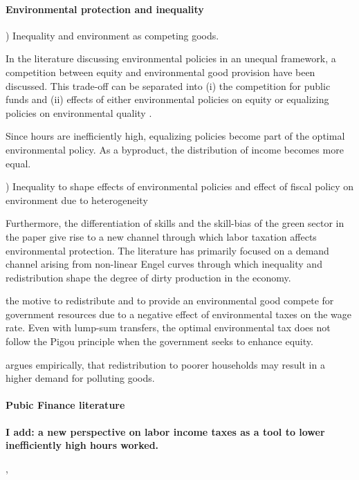 \paragraph{Environmental protection and inequality}
) Inequality and environment as competing goods.

In the literature discussing environmental policies in an unequal framework, a competition between equity and environmental good provision have been discussed. 
This trade-off can be separated into (i) the competition for public funds \citep{LansBovenberg1996OptimalAnalyses, Jacobs2019RedistributionCurves} and (ii) effects of either environmental policies on equity or equalizing policies on environmental quality \citep{Jacobs2019RedistributionCurves, Sager2019IncomeCurves, Dobkowitz2022}. 

Since hours are inefficiently high, equalizing policies become part of the optimal environmental policy. As a byproduct, the distribution of income becomes more equal.


) Inequality to shape effects of environmental policies and effect of fiscal policy on environment due to heterogeneity

 Furthermore, the differentiation of skills and the skill-bias of the green sector in the paper give rise to a new channel through which labor taxation affects environmental protection. The literature has primarily focused on a demand channel arising from non-linear Engel curves through which inequality and redistribution shape the degree of dirty production in the economy.   

\cite{Jacobs2019RedistributionCurves} the motive to redistribute and to provide an environmental good compete for government resources due to a negative effect of environmental taxes on the wage rate. Even with lump-sum transfers, the optimal environmental tax does not follow the Pigou principle when the government seeks to enhance equity.

\cite{Sager2019IncomeCurves} argues empirically, that redistribution to poorer households may result in a higher demand for polluting goods. 
\paragraph{Pubic Finance literature}
\textbf{I add: a new perspective on labor income taxes as a tool to lower inefficiently high hours worked. }

 \cite{Heathcote2017OptimalFramework}, \cite{Loebbing2019NationalChange}

